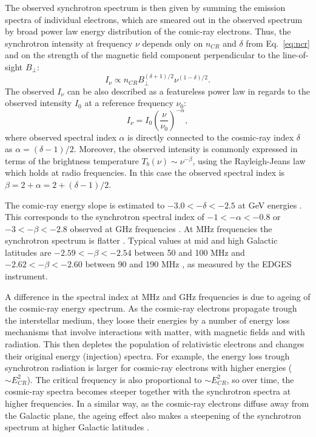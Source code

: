 The observed synchrotron spectrum is then given by summing the emission spectra of individual electrons, which are smeared out in the observed spectrum by broad power law energy distribution of the comic-ray electrons. Thus, the synchrotron intensity at frequency $\nu$ depends only on $n_{CR}$ and $\delta$ from Eq.~\ref{eq:ncr} and on the strength of the magnetic field component perpendicular to the line-of-sight $B_\perp$:
\begin{equation}\label{eq:Isyn}
I_{\nu}\propto n_{CR}B_\perp^{(\delta+1)/2}\nu^{(1-\delta)/2}.
\end{equation}
The observed $I_{\nu}$ can be also described as a featureless power law in regards to the observed intensity $I_0$ at a reference frequency $\nu_0$:
\begin{equation}
I_{\nu}=I_0\left( \frac{\nu}{\nu_0} \right)^{-\alpha},
\end{equation}
where observed spectral index $\alpha$ is directly connected to the cosmic-ray  index $\delta$ as $\alpha=(\delta-1)/2$. Moreover,  the observed intensity is commonly expressed in terms of the brightness temperature $T_{b}(\nu)\sim\nu^{-\beta}$, using the Rayleigh-Jeans law which holds at radio frequencies. In this case the observed spectral index is $\beta=2+\alpha=2+(\delta-1)/2$. 

The comic-ray energy slope is estimated to  $-3.0<-\delta<-2.5$ at GeV energies \cite{lawson87, orlando13, strong11}. This corresponds to the synchrotron spectral index of $-1<-\alpha<-0.8$ or $-3<-\beta<-2.8$ observed at GHz frequencies \cite{platania98, reich88}.  At MHz frequencies the synchrotron spectrum is flatter \cite{guzman11, rogers08}. Typical values at mid and high Galactic latitudes are $-2.59 < -\beta < -2.54$ between 50 and 100 MHz \cite{mozdzen19} and $-2.62 < -\beta < -2.60$  between 90 and 190 MHz \cite{mozdzen17}, as measured by the EDGES instrument.  

A difference in the spectral index at MHz and GHz frequencies is due to ageing of the cosmic-ray energy spectrum. As the cosmic-ray electrons propagate trough the interstellar medium, they loose their energies by a number of energy loss mechanisms \cite{longair11} that involve interactions with matter, with magnetic fields and with radiation. This then depletes the population of relativistic electrons and changes their original energy (injection) spectra. For example, the energy loss trough synchrotron radiation is larger for cosmic-ray electrons with higher energies ($\sim E_{CR}^2$). The critical frequency is also proportional to $\sim E_{CR}^2$, so over time, the cosmic-ray spectra becomes steeper together with the synchrotron spectra at higher frequencies.  In a similar way, as the cosmic-ray electrons diffuse away from the Galactic plane, the ageing effect also makes a steepening of the synchrotron spectrum at higher Galactic latitudes \cite{strong07}.

